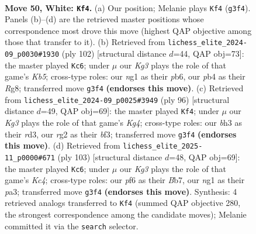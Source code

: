 \documentclass[11pt]{article}
\begin{document}
\clearpage

\begin{figure}[p]\centering
\begin{subfigure}{0.46\textwidth}\centering
\resizebox{\linewidth}{!}{%
\newchessgame
\chessboard[
  setfen={8/7p/3r1p1k/6R1/1p2P1P1/6Kb/6r1/6n1 w - - 3 50},
  showmover=false,
  pgfstyle=straightmove, color=movearrow, markmove={g3-f4}
]}
\caption{}
\end{subfigure}\hfill
\begin{subfigure}{0.46\textwidth}\centering
\resizebox{\linewidth}{!}{%
\newchessgame
\chessboard[
  setfen={6R1/8/1p3p2/1Kb2k2/1r3P2/6P1/4R3/8 w - - 15 52},
  showmover=false,
  pgfstyle=straightmove, color=movearrow, markmove={b5-c6}
]}
\caption{}
\end{subfigure}
\\[4pt]
\begin{subfigure}{0.46\textwidth}\centering
\resizebox{\linewidth}{!}{%
\newchessgame
\chessboard[
  setfen={6R1/1p6/1k2p1p1/2R3P1/1P1P2K1/3r1bB1/8/8 w - - 20 49},
  showmover=false,
  pgfstyle=straightmove, color=movearrow, markmove={g4-f4}
]}
\caption{}
\end{subfigure}\hfill
\begin{subfigure}{0.46\textwidth}\centering
\resizebox{\linewidth}{!}{%
\newchessgame
\chessboard[
  setfen={7r/1b6/1P6/pRk5/8/P4p1P/5K2/5B2 b - - 13 52},
  showmover=false,
  pgfstyle=straightmove, color=movearrow, markmove={c5-c6}
]}
\caption{}
\end{subfigure}
\caption{\textbf{Move 50, White: \texttt{Kf4}.} (a) Our position; Melanie plays \texttt{Kf4} (\texttt{g3f4}). Panels (b)--(d) are the retrieved master positions whose correspondence most drove this move (highest QAP objective among those that transfer to it). (b) Retrieved from \texttt{lichess\_elite\_2024-09\_p0030\#1930} (ply 102) [structural distance $d$=44, QAP obj=73]: the master played \texttt{Kc6}; under $\mu$ our \emph{Kg3} plays the role of that game's \emph{Kb5}; cross-type roles: our \emph{n}g1 as their \emph{p}b6, our \emph{p}b4 as their \emph{R}g8; transferred move \texttt{g3f4} \textbf{(endorses this move)}. (c) Retrieved from \texttt{lichess\_elite\_2024-09\_p0025\#3949} (ply 96) [structural distance $d$=49, QAP obj=69]: the master played \texttt{Kf4}; under $\mu$ our \emph{Kg3} plays the role of that game's \emph{Kg4}; cross-type roles: our \emph{b}h3 as their \emph{r}d3, our \emph{r}g2 as their \emph{b}f3; transferred move \texttt{g3f4} \textbf{(endorses this move)}. (d) Retrieved from \texttt{lichess\_elite\_2025-11\_p0000\#671} (ply 103) [structural distance $d$=48, QAP obj=69]: the master played \texttt{Kc6}; under $\mu$ our \emph{Kg3} plays the role of that game's \emph{Kc4}; cross-type roles: our \emph{p}f6 as their \emph{B}b7, our \emph{n}g1 as their \emph{p}a3; transferred move \texttt{g3f4} \textbf{(endorses this move)}. Synthesis: 4 retrieved analogs transferred to \texttt{Kf4} (summed QAP objective 280, the strongest correspondence among the candidate moves); Melanie committed it via the \texttt{search} selector.}
\label{fig:thought-m98}
\end{figure}
\end{document}
